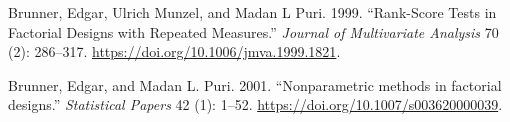 \documentclass[]{article}
\begin{document}
\hypertarget{refs}{}
\leavevmode\hypertarget{ref-Brunner1999}{}%
Brunner, Edgar, Ulrich Munzel, and Madan L Puri. 1999. ``Rank-Score
Tests in Factorial Designs with Repeated Measures.'' \emph{Journal of
Multivariate Analysis} 70 (2): 286--317.
\url{https://doi.org/10.1006/jmva.1999.1821}.

\leavevmode\hypertarget{ref-Brunner2001}{}%
Brunner, Edgar, and Madan L. Puri. 2001. ``Nonparametric methods in
factorial designs.'' \emph{Statistical Papers} 42 (1): 1--52.
\url{https://doi.org/10.1007/s003620000039}.
\end{document}
